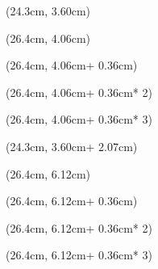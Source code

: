 \def\AttributeX{24.3cm}
\def\AttributeY{3.60cm}
\def\AttributeYOffset{2.07cm}

\def\ActionX{26.4cm}
\def\InsightY{4.06cm}
\def\ProwessY{6.12cm}
\def\ResolveY{8.19cm}
\def\ActionYOffset{0.36cm}

\InsightCalc
\begin{textblock*}{2.1cm}(\AttributeX, \AttributeY)
    \ifexpectedvalue
        \AttributeFormat{\ExpectedValue{\InsightVal}}
    \else
        \AttributeFormat{\SuccessProbability{\InsightVal}}
    \fi
\end{textblock*}

\begin{textblock*}{2.1cm}(\ActionX, \InsightY)
    \ActionFormat{\SuccessProbability{\Hunt}}
\end{textblock*}
\begin{textblock*}{2.1cm}(\ActionX, \InsightY + \ActionYOffset)
    \ActionFormat{\SuccessProbability{\Study}}
\end{textblock*}
\begin{textblock*}{2.1cm}(\ActionX, \InsightY + \ActionYOffset * 2)
    \ActionFormat{\SuccessProbability{\Survey}}
\end{textblock*}
\begin{textblock*}{2.1cm}(\ActionX, \InsightY + \ActionYOffset * 3)
    \ActionFormat{\SuccessProbability{\Tinker}}
\end{textblock*}


\ProwessCalc
\begin{textblock*}{2.1cm}(\AttributeX, \AttributeY + \AttributeYOffset)
    \ifexpectedvalue
        \AttributeFormat{\ExpectedValue{\ProwessVal}}
    \else
        \AttributeFormat{\SuccessProbability{\ProwessVal}}
    \fi
\end{textblock*}

\begin{textblock*}{2.1cm}(\ActionX, \ProwessY)
    \ActionFormat{\SuccessProbability{\Finesse}}
\end{textblock*}
\begin{textblock*}{2.1cm}(\ActionX, \ProwessY + \ActionYOffset)
    \ActionFormat{\SuccessProbability{\Prowl}}
\end{textblock*}
\begin{textblock*}{2.1cm}(\ActionX, \ProwessY + \ActionYOffset * 2)
    \ActionFormat{\SuccessProbability{\Skirmish}}
\end{textblock*}
\begin{textblock*}{2.1cm}(\ActionX, \ProwessY + \ActionYOffset * 3)
    \ActionFormat{\SuccessProbability{\Wreck}}
\end{textblock*}


